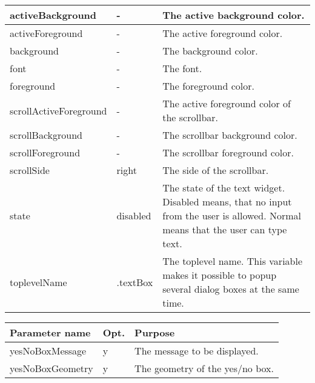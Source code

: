 {\newpage
\clearpage
\samepage \begin{supertabular}{|l|l|p{5.3cm}|}
activeBackground       & -        & The active background
                                    color.\\  \hline
activeForeground       & -        & The active foreground
                                    color.\\  \hline
background             & -        & The background color.\\  \hline
font                   & -        & The font.\\  \hline
foreground             & -        & The foreground color.\\  \hline
scrollActiveForeground & -        & The active foreground
                                    color of the scrollbar.\\  \hline 
scrollBackground       & -        & The scrollbar background
                                    color.\\  \hline
scrollForeground       & -        & The scrollbar foreground
                                    color.\\  \hline
scrollSide             & right    & The side of the
                                    scrollbar.\\  \hline
state                  & disabled & The state of the text
                                    widget. Disabled means,
                                    that no input from the
                                    user is allowed. Normal
                                    means that the user can
                                    type text.\\  \hline
toplevelName           & .textBox & The toplevel name. This
                                    variable makes it
                                    possible to popup
                                    several dialog boxes at
                                    the same time.\\  \hline
\end{supertabular}
}

{\newpage
\clearpage
\samepage \begin{figure}[ht]
  \centerline{
  \epsfysize=3.3cm
  }
  
  \label{fig:TextBox}
\end{figure}
}

{\newpage
\clearpage
\samepage \begin{tabular}{|l|l|p{6.5cm}|} \hline
Parameter name   & Opt. & Purpose\\  \hline
yesNoBoxMessage  & y    & The message to be displayed.\\  \hline
yesNoBoxGeometry & y    & The geometry of the yes/no box.\\  \hline
\end{tabular}
}

